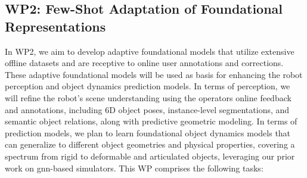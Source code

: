 \documentclass{erc-B2}
\begin{document}
\subsection{WP2: Few-Shot Adaptation of Foundational Representations}
In WP2, we aim to develop adaptive foundational models that utilize extensive offline datasets and are receptive to online user annotations and corrections. These adaptive foundational models  will be used as basis for enhancing the robot perception and object dynamics prediction models. In terms of perception, we will refine the robot's scene understanding using the operators online feedback and annotations, including 6D object poses, instance-level segmentations, and semantic object relations, along with predictive geometric modeling. %
In terms of prediction models, we plan to learn foundational object dynamics models that can generalize to different object geometries and physical properties, covering a spectrum from rigid to deformable and articulated objects, leveraging our prior work on \gls*{gnn}-based simulators. This WP comprises the following tasks:
\end{document}
